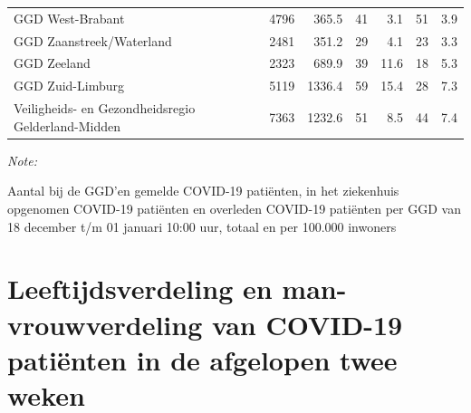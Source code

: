 \documentclass[
  english,
  man,floatsintext]{apa6}
\begin{document}
\begin{table}[H]
\begin{threeparttable}
\begin{tabular}{lrrrrrr}
GGD West-Brabant & 4796 & 365.5 & 41 & 3.1 & 51 & 3.9\\
GGD Zaanstreek/Waterland & 2481 & 351.2 & 29 & 4.1 & 23 & 3.3\\
GGD Zeeland & 2323 & 689.9 & 39 & 11.6 & 18 & 5.3\\
GGD Zuid-Limburg & 5119 & 1336.4 & 59 & 15.4 & 28 & 7.3\\
Veiligheids- en Gezondheidsregio Gelderland-Midden & 7363 & 1232.6 & 51 & 8.5 & 44 & 7.4\\
\bottomrule
\end{tabular}
\begin{tablenotes}
\item \textit{Note: } 
\item Aantal bij de GGD’en gemelde COVID-19 patiënten, in het ziekenhuis opgenomen COVID-19 patiënten en overleden COVID-19 patiënten per GGD van 18 december t/m 01 januari 10:00 uur, totaal en per 100.000 inwoners
\end{tablenotes}
\end{threeparttable}
\endgroup{}
\end{table}

\newpage

\hypertarget{leeftijdsverdeling-en-man-vrouwverdeling-van-covid-19-patiuxebnten-in-de-afgelopen-twee-weken}{%
\section{Leeftijdsverdeling en man-vrouwverdeling van COVID-19 patiënten in de afgelopen twee weken}\label{leeftijdsverdeling-en-man-vrouwverdeling-van-covid-19-patiuxebnten-in-de-afgelopen-twee-weken}}
\end{document}
